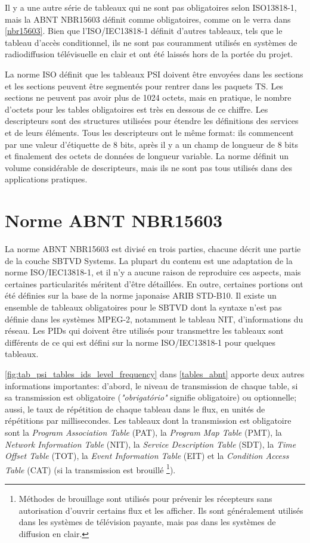 \documentclass[12pt,a4paper]{article}
\begin{document}
Il y a une autre série de tableaux qui ne sont pas obligatoires selon ISO13818-1, mais la ABNT NBR15603 définit comme obligatoires, comme on le verra dans \autoref{nbr15603}. Bien que l'ISO/IEC13818-1 définit d'autres tableaux, tels que le tableau d'accès conditionnel, ils ne sont pas couramment utilisés en systèmes de radiodiffusion télévisuelle en clair et ont été laissés hors de la portée du projet.

La norme ISO définit que les tableaux PSI doivent être envoyées dans les sections et les sections peuvent être segmentés pour rentrer dans les paquets TS. Les sections ne peuvent pas avoir plus de 1024 octets, mais en pratique, le nombre d'octets pour les tables obligatoires est très en dessous de ce chiffre. Les descripteurs sont des structures utilisées pour étendre les définitions des services et de leurs éléments. Tous les descripteurs ont le même format: ils commencent par une valeur d'étiquette de 8 bits, après il y a un champ de longueur de 8 bits et finalement des octets de données de longueur variable. La norme définit un volume considérable de descripteurs, mais ils ne sont pas tous utilisés dans des applications pratiques.

\section{Norme ABNT NBR15603}
\label{nbr15603}

La norme ABNT NBR15603 est divisé en trois parties, chacune décrit une partie de la couche SBTVD Systems. La plupart du contenu est une adaptation de la norme ISO/IEC13818-1, et il n'y a aucune raison de reproduire ces aspects, mais certaines particularités méritent d'être détaillées. En outre, certaines portions ont été définies sur la base de la norme japonaise ARIB STD-B10. Il existe un ensemble de tableaux obligatoires pour le SBTVD dont la syntaxe n'est pas définie dans les systèmes MPEG-2, notamment le tableau NIT, d'informations du réseau. Les PIDs qui doivent être utilisés pour transmettre les tableaux sont différents de ce qui est défini sur la norme ISO/IEC13818-1 pour quelques tableaux.

\autoref{fig:tab_psi_tables_ids_level_frequency} dans \autoref{tables_abnt} apporte deux autres informations importantes: d'abord, le niveau  de transmission de chaque table, si sa transmission est obligatoire (\textit{"obrigatório"} signifie obligatoire) ou optionnelle; aussi, le taux de répétition de chaque tableau dans le flux, en unités de répétitions par millisecondes. Les tableaux dont la transmission est obligatoire sont la \textit{Program Association Table} (PAT), la \textit{Program Map Table} (PMT), la \textit{Network Information Table} (NIT), la \textit{Service Description Table} (SDT), la \textit{Time Offset Table} (TOT), la \textit{Event Information Table} (EIT) et la \textit{Condition Access Table}  (CAT) (si la transmission est brouillé \footnote{Méthodes de brouillage sont utilisés pour prévenir les récepteurs sans autorisation d'ouvrir certains flux et les afficher. Ils sont généralement utilisés dans les systèmes de télévision payante, mais pas dans les systèmes de diffusion en clair.}).
\end{document}
